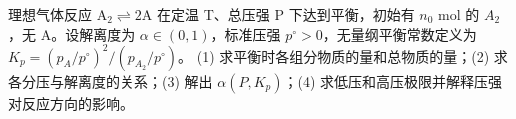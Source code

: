 理想气体反应 \(\mathrm{A}_2\rightleftharpoons2\mathrm A\) 在定温 T、总压强 P 下达到平衡，初始有 \(n_0\) mol 的 \(A_{2}\)，无 A。设解离度为 \(\alpha\in(0,1)\)，标准压强 \(p^\circ>0\)，无量纲平衡常数定义为 \(K_p=(p_A/p^\circ)^2/(p_{A_2}/p^\circ)\)。
(1) 求平衡时各组分物质的量和总物质的量；(2) 求各分压与解离度的关系；(3) 解出 \(\alpha(P,K_p)\)；(4) 求低压和高压极限并解释压强对反应方向的影响。
